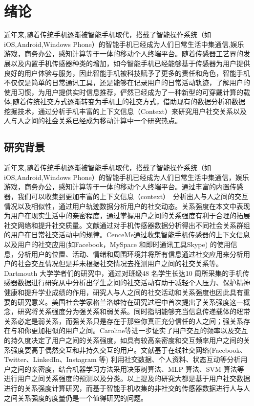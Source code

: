 \chapter{绪论}
近年来,随着传统手机逐渐被智能手机取代，搭载了智能操作系统（如iOS,Android,Windows Phone）的智能手机已经成为人们日常生活中集通信,娱乐游戏，商务办公，感知计算等于一体的移动个人终端平台。随着传感器工艺界的发展以及内置手机传感器种类的增加，如今智能手机已经能够基于传感器为用户提供良好的用户体验与服务，因此智能手机被科技赋予了更多的责任和角色，智能手机不仅仅是简单的日常通讯工具，还是能够在记录用户的日常活动轨迹，了解用户的使用习惯，为用户提供实时信息推荐，俨然已经成为了一种新型的可穿戴计算的载体,随着传统社交方式逐渐转变为手机上的社交方式，借助现有的数据分析和数据挖掘技术，通过分析手机丰富的上下文信息（Context）来研究用户社交关系以及人与人之间的社会关系已经成为移动计算中一个研究热点。

\section{研究背景}

近年来,随着传统手机逐渐被智能手机取代，搭载了智能操作系统（如iOS,Android,Windows Phone）的智能手机已经成为人们日常生活中集通信，娱乐游戏，商务办公，感知计算等于一体的移动个人终端平台。通过丰富的内置传感器，我们可以收集到更加丰富的上下文信息（context）　分析出人与人之间的交互情况以及相似性，通过用户轨迹数据分析用户的社交动态。关系强度在本文中表现为用户在现实生活中的亲密程度，通过掌握用户之间的关系强度有利于合理的拓展社交网络和提升社交质量。文献\cite{eagle2006reality}通过对手机传感器数据分析得出不同社会关系群组的用户在日常社交活动中的规律。CenceMe通过收集智能手机传感器的上下文信息以及用户的社交应用(如Facebook，MySpace 和即时通讯工具Skype) 的使用信息，分析用户的位置、活动、情绪和周围环境并将所有信息通过社交应用来分析用户的社会交互情况但是并未根据社交情况去推测用户之间的社交关系等。Dartmouth 大学学者们的研究中，通过对班级48 名学生长达10 周所采集的手机传感器数据进行研究从中分析出学生之间的社交活动有助于减轻个人压力、保护精神健康和提升学业成绩的作用，研究人与人之间的社交活动和关系强度也因此具有重要的研究意义。美国社会学家格兰洛维特在研究过程中首次提出了关系强度这一概念，研究将关系强度分为强关系和弱关系。同时指明能够充当信息传递载体的纽带关系必定是弱关系，而强关系只是存在于那些你真正充分信任的人之间；强关系存在与和你更加相似的用户之间。Caroline等进一步证实了用户交互的频率以及交互的持久度决定了用户之间的关系强度，如具有较高亲密度和交互频率用户之间的关系强度要高于偶然交互和非持久交互的用户。文献\cite{gustafson2012extracting,khadangi2013measuring,zhao2012relationship}基于在线社交网络(Facebook、Twitter、LinkedIn、Instagram 等) 利用社交数据、个人资料、状态互动等分析用户之间的亲密度，结合机器学习方法采用决策树算法、MLP 算法、SVM 算法等进行用户之间关系强度的预测以及分类。以上提及的研究大都是基于用户社交数据进行的关系强度计算研究，而基于智能手机收集的非社交的传感器数据进行人与人之间关系强度的度量仍是一个值得研究的问题。

